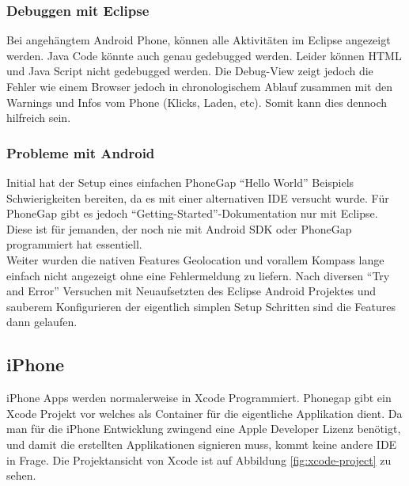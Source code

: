 \subsubsection{Debuggen mit Eclipse} %
\label{ssub:Debuggen mit Eclipse}
Bei angehängtem Android Phone, können alle Aktivitäten im Eclipse angezeigt werden. Java Code könnte auch genau gedebugged werden. Leider können HTML und Java Script nicht gedebugged werden. Die Debug-View zeigt jedoch die Fehler wie einem Browser jedoch in chronologischem Ablauf zusammen mit den Warnings und Infos vom Phone (Klicks, Laden, etc). Somit kann dies dennoch hilfreich sein. 

\subsubsection{Probleme mit Android} %
\label{ssub:probleme_mit_android}
Initial hat der Setup eines einfachen PhoneGap "`Hello World"' Beispiels Schwierigkeiten bereiten, da es mit einer alternativen IDE versucht wurde. Für PhoneGap gibt es jedoch "`Getting-Started"'-Dokumentation nur mit Eclipse. Diese ist für jemanden, der noch nie mit Android SDK oder PhoneGap programmiert hat essentiell. \\
Weiter wurden die nativen Features Geolocation und vorallem Kompass lange einfach nicht angezeigt ohne eine Fehlermeldung zu liefern. Nach diversen "`Try and Error"' Versuchen mit Neuaufsetzten des Eclipse Android Projektes und sauberem Konfigurieren der eigentlich simplen Setup Schritten sind die Features dann gelaufen. 


\subsection{iPhone} %
\label{sub:iPhone}
iPhone Apps werden normalerweise in Xcode Programmiert. Phonegap gibt ein Xcode Projekt vor welches als Container für die eigentliche Applikation dient. Da man für die iPhone Entwicklung zwingend eine Apple Developer Lizenz benötigt, und damit die erstellten Applikationen signieren muss, kommt keine andere IDE in Frage. Die Projektansicht von Xcode ist auf Abbildung \ref{fig:xcode-project} zu sehen.

